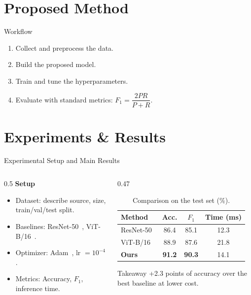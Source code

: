 \documentclass[aspectratio=169, 11pt, t]{beamer}
\begin{document}
\section{Proposed Method}

\begin{frame}{Workflow}
  \begin{enumerate}
    \item Collect and preprocess the data.
    \item Build the proposed model.
    \item Train and tune the hyperparameters.
    \item Evaluate with standard metrics: $F_1 = \dfrac{2PR}{P+R}$.
  \end{enumerate}
\end{frame}

\section{Experiments \& Results}

\begin{frame}{Experimental Setup and Main Results}
  \begin{columns}[T]
    \begin{column}{0.5\textwidth}
      \textbf{Setup}
      \begin{itemize}
        \item Dataset: describe source, size, train/val/test split.
        \item Baselines: ResNet-50~\cite{he2016resnet}, ViT-B/16~\cite{dosovitskiy2021vit}.
        \item Optimizer: Adam~\cite{kingma2015adam}, lr $=10^{-4}$.
        \item Metrics: Accuracy, $F_1$, inference time.
      \end{itemize}
    \end{column}
    \begin{column}{0.47\textwidth}
      \begin{table}
        \caption{Comparison on the test set (\%).}
        \centering\small
        \begin{tabular}{lccc}
          \toprule
          Method & Acc. & $F_1$ & Time (ms) \\
          \midrule
          ResNet-50~\cite{he2016resnet}      & 86.4 & 85.1 & 12.3 \\
          ViT-B/16~\cite{dosovitskiy2021vit} & 88.9 & 87.6 & 21.8 \\
          \midrule
          \textbf{Ours}                      & \textbf{91.2} & \textbf{90.3} & 14.1 \\
          \bottomrule
        \end{tabular}
      \end{table}
      \begin{alertblock}{Takeaway}
        +2.3 points of accuracy over the best baseline at lower cost.
      \end{alertblock}
    \end{column}
  \end{columns}
\end{frame}
\end{document}
